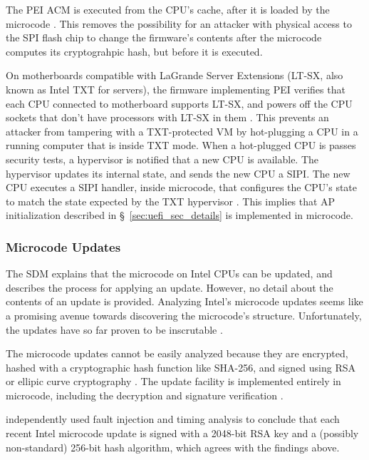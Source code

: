 The PEI ACM is executed from the CPU's cache, after it is loaded by the
microcode \cite{datta2010trustedboot, intel2012patching, datta2013acm}. This
removes the possibility for an attacker with physical access to the SPI flash
chip to change the firmware's contents after the microcode computes its
cryptograhpic hash, but before it is executed.


On motherboards compatible with LaGrande Server Extensions (LT-SX, also known
as Intel TXT for servers), the firmware implementing PEI verifies that each CPU
connected to motherboard supports LT-SX, and powers off the CPU sockets that
don't have processors with LT-SX in them \cite{intel2012ltsx}. This prevents an
attacker from tampering with a TXT-protected VM by hot-plugging a CPU in a
running computer that is inside TXT mode. When a hot-plugged CPU is passes
security tests, a hypervisor is notified that a new CPU is available. The
hypervisor updates its internal state, and sends the new CPU a SIPI. The new
CPU executes a SIPI handler, inside microcode, that configures the CPU's state
to match the state expected by the TXT hypervisor \cite{intel2012ltsx}. This
implies that AP initialization described in \S~\ref{sec:uefi_sec_details} is
implemented in microcode.


\subsubsection{Microcode Updates}
\label{microcode:updates}

The SDM explains that the microcode on Intel CPUs can be updated, and describes
the process for applying an update. However, no detail about the contents of an
update is provided. Analyzing Intel's microcode updates seems like a promising
avenue towards discovering the microcode's structure. Unfortunately, the
updates have so far proven to be inscrutable \cite{chen2014microcode}.


The microcode updates cannot be easily analyzed because they are encrypted,
hashed with a cryptographic hash function like SHA-256, and signed using RSA or
ellipic curve cryptography \cite{intel2012patching}. The update facility is
implemented entirely in microcode, including the decryption and signature
verification \cite{intel2012patching}.

\cite{hawkes2012microcode} independently used fault injection and timing
analysis to conclude that each recent Intel microcode update is signed with a
2048-bit RSA key and a (possibly non-standard) 256-bit hash algorithm, which
agrees with the findings above.


